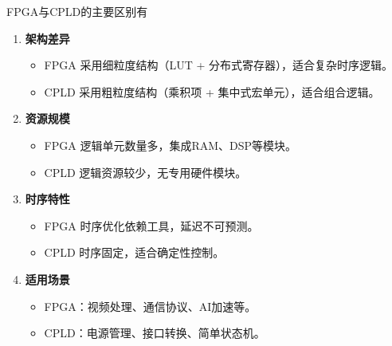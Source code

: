 \documentclass[
  ignorenonframetext,
  chinese,
]{beamer}
\providecommand{\tightlist}{%
  \setlength{\itemsep}{0pt}\setlength{\parskip}{0pt}}
\begin{document}
\begin{frame}{FPGA与CPLD的主要区别有}
\label{fpgaux4e0ecpldux7684ux4e3bux8981ux533aux522bux6709}
\begin{enumerate}
\tightlist
\item
  \textbf{架构差异}

  \begin{itemize}
  \tightlist
  \item
    FPGA 采用细粒度结构（LUT + 分布式寄存器），适合复杂时序逻辑。\\
  \item
    CPLD 采用粗粒度结构（乘积项 + 集中式宏单元），适合组合逻辑。
  \end{itemize}
\item
  \textbf{资源规模}

  \begin{itemize}
  \tightlist
  \item
    FPGA 逻辑单元数量多，集成RAM、DSP等模块。\\
  \item
    CPLD 逻辑资源较少，无专用硬件模块。
  \end{itemize}
\item
  \textbf{时序特性}

  \begin{itemize}
  \tightlist
  \item
    FPGA 时序优化依赖工具，延迟不可预测。\\
  \item
    CPLD 时序固定，适合确定性控制。
  \end{itemize}
\item
  \textbf{适用场景}

  \begin{itemize}
  \tightlist
  \item
    FPGA：视频处理、通信协议、AI加速等。\\
  \item
    CPLD：电源管理、接口转换、简单状态机。
  \end{itemize}
\end{enumerate}
\end{frame}
\end{document}
